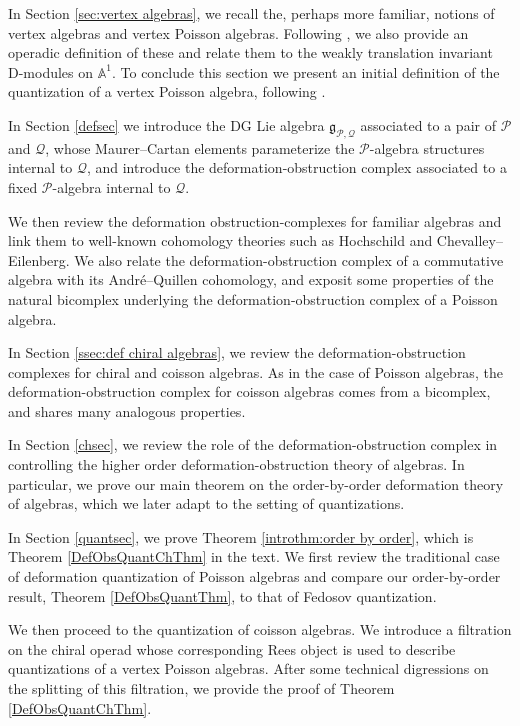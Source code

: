 \documentclass[11pt]{amsart}
\numberwithin{equation}{section}
\theoremstyle{definition}
\newcommand{\mc}{\mathcal}
\newcommand{\0}{{\textbf{0}}}
\def\IA{\mathbb{A}}
\def\PP{{\mc P}}
\def\QQ{{\mc Q}}
\def\gf{\mathfrak{g}}
\begin{document}
In Section \ref{sec:vertex algebras}, we recall the, perhaps more familiar, notions of vertex algebras and vertex Poisson algebras. Following \cite{BD1,BDSHK19}, we also provide an operadic definition of these and relate them to the weakly translation invariant D-modules on $\IA^1$. To conclude this section we present an initial definition of the quantization of a vertex Poisson algebra, following \cite{Arakawa2015:local}.

In Section \ref{defsec} we introduce the DG Lie algebra $\gf_{\PP,\QQ}$ associated to a pair of $\PP$ and $\QQ$,  whose Maurer--Cartan elements parameterize the $\PP$-algebra structures internal to $\QQ$, and introduce the deformation-obstruction complex associated to a fixed $\PP$-algebra internal to $\QQ$.

We then review the deformation obstruction-complexes for familiar algebras and link them to well-known cohomology theories such as Hochschild and Chevalley--Eilenberg. We also relate the deformation-obstruction complex of a commutative algebra with its Andr\'e--Quillen cohomology, and exposit some properties of the natural bicomplex underlying the deformation-obstruction complex of a Poisson algebra.

In Section \ref{ssec:def chiral algebras}, we review the deformation-obstruction complexes for chiral and coisson algebras. As in the case of Poisson algebras, the deformation-obstruction complex for coisson algebras comes from a bicomplex, and shares many analogous properties.

In Section \ref{chsec}, we review the role of the deformation-obstruction complex in controlling the higher order deformation-obstruction theory of algebras. In particular, we prove our main theorem on the order-by-order deformation theory of algebras, which we later adapt to the setting of quantizations.

In Section \ref{quantsec}, we prove Theorem \ref{introthm:order by order}, which is Theorem \ref{DefObsQuantChThm} in the text. We first review the traditional case of deformation quantization of Poisson algebras and compare our order-by-order result, Theorem \ref{DefObsQuantThm}, to that of Fedosov quantization.

We then proceed to the quantization of coisson algebras. We introduce a filtration on the chiral operad whose corresponding Rees object is used to describe quantizations of a vertex Poisson algebras. After some technical digressions on the splitting of this filtration, we provide the proof of Theorem \ref{DefObsQuantChThm}.
\end{document}
